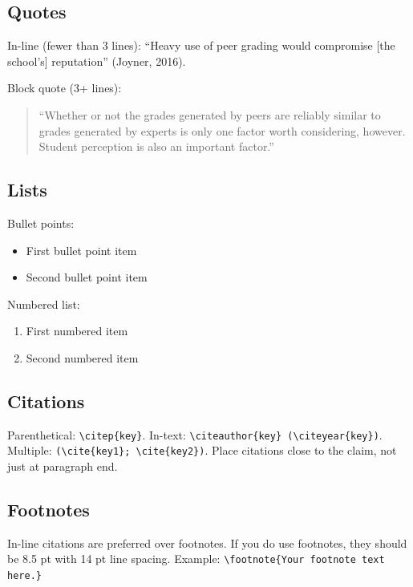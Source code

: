 \documentclass[
	letterpaper, %
]{jdf}
\begin{document}
\subsection*{Quotes}

In-line (fewer than 3 lines): ``Heavy use of peer grading would compromise [the school's] reputation'' (Joyner, 2016).

Block quote (3+ lines):

\begin{quotation}
	\noindent ``Whether or not the grades generated by peers are reliably similar to grades generated by experts is only one factor worth considering, however. Student perception is also an important factor.''
\end{quotation}

\subsection*{Lists}

Bullet points:

\begin{itemize}
	\item First bullet point item
	\item Second bullet point item
\end{itemize}

Numbered list:

\begin{enumerate}
	\item First numbered item
	\item Second numbered item
\end{enumerate}

\subsection*{Citations}

Parenthetical: \verb|\citep{key}|. In-text: \verb|\citeauthor{key} (\citeyear{key})|. Multiple: \verb|(\cite{key1}; \cite{key2})|. Place citations close to the claim, not just at paragraph end.

\subsection*{Footnotes}

In-line citations are preferred over footnotes. If you do use footnotes, they should be 8.5 pt with 14 pt line spacing. Example: \verb|\footnote{Your footnote text here.}|
\end{document}
